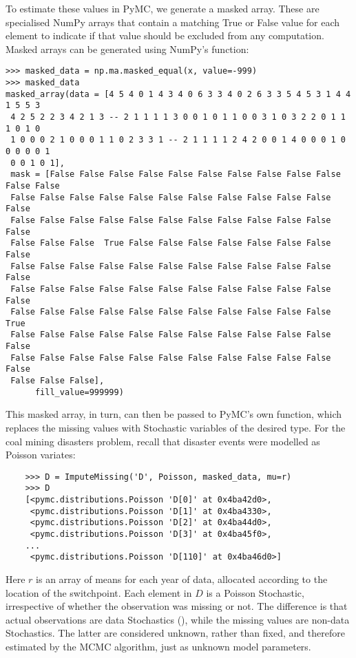 To estimate these values in PyMC, we generate a masked array. These are specialised NumPy arrays that contain a matching True or False value for each element to indicate if that value should be excluded from any computation. Masked arrays can be generated using NumPy's  function:
\begin{verbatim}
>>> masked_data = np.ma.masked_equal(x, value=-999)
>>> masked_data
masked_array(data = [4 5 4 0 1 4 3 4 0 6 3 3 4 0 2 6 3 3 5 4 5 3 1 4 4 1 5 5 3
 4 2 5 2 2 3 4 2 1 3 -- 2 1 1 1 1 3 0 0 1 0 1 1 0 0 3 1 0 3 2 2 0 1 1 1 0 1 0
 1 0 0 0 2 1 0 0 0 1 1 0 2 3 3 1 -- 2 1 1 1 1 2 4 2 0 0 1 4 0 0 0 1 0 0 0 0 0 1
 0 0 1 0 1],
 mask = [False False False False False False False False False False False False
 False False False False False False False False False False False False
 False False False False False False False False False False False False
 False False False  True False False False False False False False False
 False False False False False False False False False False False False
 False False False False False False False False False False False False
 False False False False False False False False False False False  True
 False False False False False False False False False False False False
 False False False False False False False False False False False False
 False False False],
      fill_value=999999)

\end{verbatim}

This masked array, in turn, can then be passed to PyMC's own  function, which replaces the missing values with Stochastic variables of the desired type. For the coal mining disasters problem, recall that disaster events were modelled as Poisson variates:

\begin{verbatim}
	>>> D = ImputeMissing('D', Poisson, masked_data, mu=r)
	>>> D
	[<pymc.distributions.Poisson 'D[0]' at 0x4ba42d0>,
	 <pymc.distributions.Poisson 'D[1]' at 0x4ba4330>,
	 <pymc.distributions.Poisson 'D[2]' at 0x4ba44d0>,
	 <pymc.distributions.Poisson 'D[3]' at 0x4ba45f0>,
	...
	 <pymc.distributions.Poisson 'D[110]' at 0x4ba46d0>]
\end{verbatim}

Here $r$ is an array of means for each year of data, allocated according to the location of the switchpoint. Each element in $D$ is a Poisson Stochastic, irrespective of whether the observation was missing or not. The difference is that actual observations are data Stochastics (), while the missing values are non-data Stochastics. The latter are considered unknown, rather than fixed, and therefore estimated by the MCMC algorithm, just as unknown model parameters.

